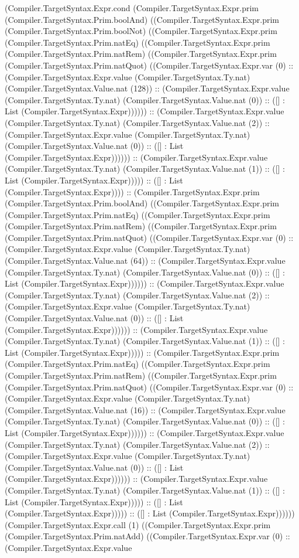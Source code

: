 \documentclass[11pt]{article}
\begin{document}
(Compiler.TargetSyntax.Expr.cond (Compiler.TargetSyntax.Expr.prim (Compiler.TargetSyntax.Prim.boolAnd) ((Compiler.TargetSyntax.Expr.prim (Compiler.TargetSyntax.Prim.boolNot) ((Compiler.TargetSyntax.Expr.prim (Compiler.TargetSyntax.Prim.natEq) ((Compiler.TargetSyntax.Expr.prim (Compiler.TargetSyntax.Prim.natRem) ((Compiler.TargetSyntax.Expr.prim (Compiler.TargetSyntax.Prim.natQuot) ((Compiler.TargetSyntax.Expr.var (0) :: (Compiler.TargetSyntax.Expr.value (Compiler.TargetSyntax.Ty.nat) (Compiler.TargetSyntax.Value.nat (128)) :: (Compiler.TargetSyntax.Expr.value (Compiler.TargetSyntax.Ty.nat) (Compiler.TargetSyntax.Value.nat (0)) :: ([] : List (Compiler.TargetSyntax.Expr)))))) :: (Compiler.TargetSyntax.Expr.value (Compiler.TargetSyntax.Ty.nat) (Compiler.TargetSyntax.Value.nat (2)) :: (Compiler.TargetSyntax.Expr.value (Compiler.TargetSyntax.Ty.nat) (Compiler.TargetSyntax.Value.nat (0)) :: ([] : List (Compiler.TargetSyntax.Expr)))))) :: (Compiler.TargetSyntax.Expr.value (Compiler.TargetSyntax.Ty.nat) (Compiler.TargetSyntax.Value.nat (1)) :: ([] : List (Compiler.TargetSyntax.Expr))))) :: ([] : List (Compiler.TargetSyntax.Expr)))) :: (Compiler.TargetSyntax.Expr.prim (Compiler.TargetSyntax.Prim.boolAnd) ((Compiler.TargetSyntax.Expr.prim (Compiler.TargetSyntax.Prim.natEq) ((Compiler.TargetSyntax.Expr.prim (Compiler.TargetSyntax.Prim.natRem) ((Compiler.TargetSyntax.Expr.prim (Compiler.TargetSyntax.Prim.natQuot) ((Compiler.TargetSyntax.Expr.var (0) :: (Compiler.TargetSyntax.Expr.value (Compiler.TargetSyntax.Ty.nat) (Compiler.TargetSyntax.Value.nat (64)) :: (Compiler.TargetSyntax.Expr.value (Compiler.TargetSyntax.Ty.nat) (Compiler.TargetSyntax.Value.nat (0)) :: ([] : List (Compiler.TargetSyntax.Expr)))))) :: (Compiler.TargetSyntax.Expr.value (Compiler.TargetSyntax.Ty.nat) (Compiler.TargetSyntax.Value.nat (2)) :: (Compiler.TargetSyntax.Expr.value (Compiler.TargetSyntax.Ty.nat) (Compiler.TargetSyntax.Value.nat (0)) :: ([] : List (Compiler.TargetSyntax.Expr)))))) :: (Compiler.TargetSyntax.Expr.value (Compiler.TargetSyntax.Ty.nat) (Compiler.TargetSyntax.Value.nat (1)) :: ([] : List (Compiler.TargetSyntax.Expr))))) :: (Compiler.TargetSyntax.Expr.prim (Compiler.TargetSyntax.Prim.natEq) ((Compiler.TargetSyntax.Expr.prim (Compiler.TargetSyntax.Prim.natRem) ((Compiler.TargetSyntax.Expr.prim (Compiler.TargetSyntax.Prim.natQuot) ((Compiler.TargetSyntax.Expr.var (0) :: (Compiler.TargetSyntax.Expr.value (Compiler.TargetSyntax.Ty.nat) (Compiler.TargetSyntax.Value.nat (16)) :: (Compiler.TargetSyntax.Expr.value (Compiler.TargetSyntax.Ty.nat) (Compiler.TargetSyntax.Value.nat (0)) :: ([] : List (Compiler.TargetSyntax.Expr)))))) :: (Compiler.TargetSyntax.Expr.value (Compiler.TargetSyntax.Ty.nat) (Compiler.TargetSyntax.Value.nat (2)) :: (Compiler.TargetSyntax.Expr.value (Compiler.TargetSyntax.Ty.nat) (Compiler.TargetSyntax.Value.nat (0)) :: ([] : List (Compiler.TargetSyntax.Expr)))))) :: (Compiler.TargetSyntax.Expr.value (Compiler.TargetSyntax.Ty.nat) (Compiler.TargetSyntax.Value.nat (1)) :: ([] : List (Compiler.TargetSyntax.Expr))))) :: ([] : List (Compiler.TargetSyntax.Expr))))) :: ([] : List (Compiler.TargetSyntax.Expr)))))) (Compiler.TargetSyntax.Expr.call (1) ((Compiler.TargetSyntax.Expr.prim (Compiler.TargetSyntax.Prim.natAdd) ((Compiler.TargetSyntax.Expr.var (0) :: (Compiler.TargetSyntax.Expr.value 
\end{document}
